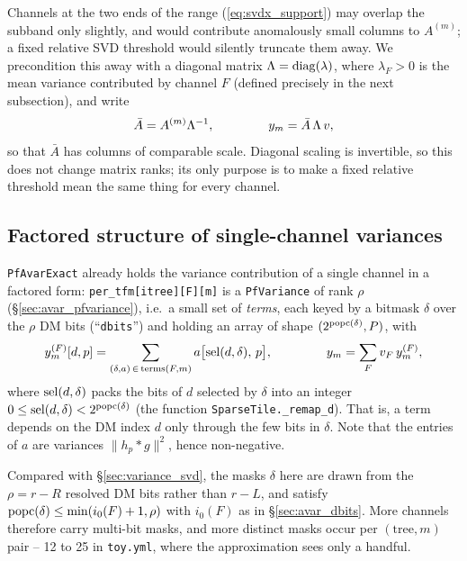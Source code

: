\documentclass{article}
\numberwithin{equation}{section}   %
\begin{document}
Channels at the two ends of the range (\ref{eq:svdx_support}) may overlap the subband only
slightly, and would contribute anomalously small columns to $A^{(m)}$; a fixed relative SVD
threshold would silently truncate them away. We precondition this away with a diagonal matrix
$\Lambda = {\rm diag}(\lambda)$, where $\lambda_F > 0$ is the mean variance contributed by
channel $F$ (defined precisely in the next subsection), and write
\begin{equation}
\bar A = A^{(m)} \Lambda^{-1},
\hspace{1.5cm}
y_m = \bar A \, \Lambda \, v,
\label{eq:svdx_abar}
\end{equation}
so that $\bar A$ has columns of comparable scale. Diagonal scaling is invertible, so this does
not change matrix ranks; its only purpose is to make a fixed relative threshold mean the same
thing for every channel.

\subsection{Factored structure of single-channel variances}
\label{ssec:svd_exact_factored}

{\tt PfAvarExact} already holds the variance contribution of a single channel in a factored
form: {\tt per\_tfm[itree][F][m]} is a {\tt PfVariance} of rank $\rho$
(\S\ref{sec:avar_pfvariance}), i.e.\ a small set of {\em terms}, each keyed by a bitmask $\delta$
over the $\rho$ DM bits (``{\tt dbits}'') and holding an array of shape
$(2^{{\rm popc}(\delta)}, P)$, with
\begin{equation}
y^{(F)}_m[d, p] = \sum_{(\delta, a) \,\in\, {\rm terms}(F,m)} a\big[ {\rm sel}(d, \delta),\, p \big],
\hspace{1.5cm}
y_m = \sum_F v_F \, y^{(F)}_m,
\label{eq:svdx_terms}
\end{equation}
where ${\rm sel}(d, \delta)$ packs the bits of $d$ selected by $\delta$ into an integer
$0 \le {\rm sel}(d, \delta) < 2^{{\rm popc}(\delta)}$ (the function
\verb|SparseTile._remap_d|). That is, a term depends on the DM index $d$ only through the few
bits in $\delta$. Note that the entries of $a$ are variances $\|h_p * g\|^2$, hence
non-negative.

Compared with \S\ref{sec:variance_svd}, the masks $\delta$ here are drawn from the $\rho = r-R$
resolved DM bits rather than $r-L$, and satisfy
${\rm popc}(\delta) \le \min(i_0(F)+1, \rho)$ with $i_0(F)$ as in \S\ref{sec:avar_dbits}. More
channels therefore carry multi-bit masks, and more distinct masks occur per $(\mbox{tree},m)$
pair -- 12 to 25 in {\tt toy.yml}, where the approximation sees only a handful.
\end{document}
